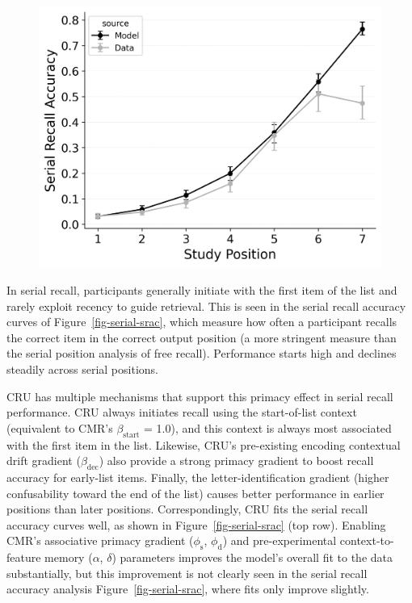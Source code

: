 \documentclass[
  man,
  floatsintext,
  longtable,
  nolmodern,
  notxfonts,
  notimes,
  draftfirst,
  colorlinks=true,linkcolor=blue,citecolor=blue,urlcolor=blue]{apa7}
\begin{document}
\begin{figure}
\begin{minipage}{0.33\linewidth}
\includegraphics{figures/bw_Gordon2021_CRU_with_Pre-Expt_and_Primacy_Confusable_Fitting_omission_error_rate_LL7.png}\end{minipage}%

\end{figure}%

In serial recall, participants generally initiate with the first item of
the list and rarely exploit recency to guide retrieval. This is seen in
the serial recall accuracy curves of Figure~\ref{fig-serial-srac}, which
measure how often a participant recalls the correct item in the correct
output position (a more stringent measure than the serial position
analysis of free recall). Performance starts high and declines steadily
across serial positions.

CRU has multiple mechanisms that support this primacy effect in serial
recall performance. CRU always initiates recall using the start-of-list
context (equivalent to CMR's \(\beta_\text{start}\) = 1.0), and this
context is always most associated with the first item in the list.
Likewise, CRU's pre-existing encoding contextual drift gradient
(\(\beta_\text{dec}\)) also provide a strong primacy gradient to boost
recall accuracy for early-list items. Finally, the letter-identification
gradient (higher confusability toward the end of the list) causes better
performance in earlier positions than later positions. Correspondingly,
CRU fits the serial recall accuracy curves well, as shown in
Figure~\ref{fig-serial-srac} (top row). Enabling CMR's associative
primacy gradient (\(\phi_\text{s}\), \(\phi_\text{d}\)) and
pre-experimental context-to-feature memory (\(\alpha\), \(\delta\))
parameters improves the model's overall fit to the data substantially,
but this improvement is not clearly seen in the serial recall accuracy
analysis Figure~\ref{fig-serial-srac}, where fits only improve slightly.
\end{document}
